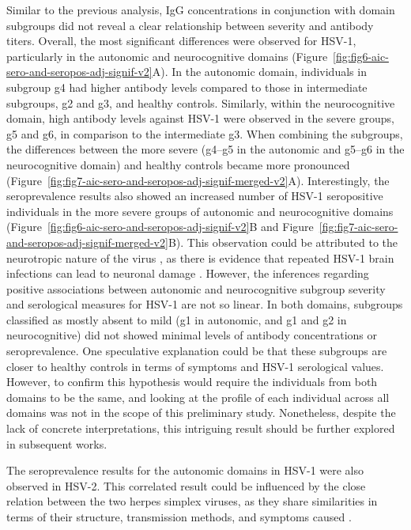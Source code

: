 Similar to the previous analysis, IgG concentrations in conjunction with domain subgroups did not reveal a clear relationship between severity and antibody titers.
Overall, the most significant differences were observed for HSV-1, particularly in the autonomic and neurocognitive domains (Figure~\ref{fig:fig6-aic-sero-and-seropos-adj-signif-v2}A).
In the autonomic domain, individuals in subgroup g4 had higher antibody levels compared to those in intermediate subgroups, g2 and g3, and healthy controls.
Similarly, within the neurocognitive domain, high antibody levels against HSV-1 were observed in the severe groups, g5 and g6, in comparison to the intermediate g3.
When combining the subgroups, the differences between the more severe (g4--g5 in the autonomic and g5--g6 in the neurocognitive domain) and healthy controls became more pronounced (Figure~\ref{fig:fig7-aic-sero-and-seropos-adj-signif-merged-v2}A).
Interestingly, the seroprevalence results also showed an increased number of HSV-1 seropositive individuals in the more severe groups of autonomic and neurocognitive domains (Figure~\ref{fig:fig6-aic-sero-and-seropos-adj-signif-v2}B and Figure~\ref{fig:fig7-aic-sero-and-seropos-adj-signif-merged-v2}B).
This observation could be attributed to the neurotropic nature of the virus \citep{olsson2016HSVPresence, marcocci2020HerpesSimplex}, as there is evidence that repeated HSV-1 brain infections can lead to neuronal damage \citep{marcocci2020HerpesSimplex, murphy2021HerpesSimplex}.
However, the inferences regarding positive associations between autonomic and neurocognitive subgroup severity and serological measures for HSV-1 are not so linear.
In both domains, subgroups classified as mostly absent to mild (g1 in autonomic, and g1 and g2 in neurocognitive) did not showed minimal levels of antibody concentrations or seroprevalence.
One speculative explanation could be that these subgroups are closer to healthy controls in terms of symptoms and HSV-1 serological values.
However, to confirm this hypothesis would require the individuals from both domains to be the same, and looking at the profile of each individual across all domains was not in the scope of this preliminary study.
Nonetheless, despite the lack of concrete interpretations, this intriguing result should be further explored in subsequent works.

The seroprevalence results for the autonomic domains in HSV-1 were also observed in HSV-2.
This correlated result could be influenced by the close relation between the two herpes simplex viruses, as they share similarities in terms of their structure, transmission methods, and symptoms caused \citep{bradley2014SeroprevalenceHerpes, kawaguchi2018HumanHerpesviruses}.

